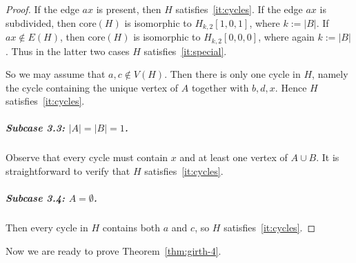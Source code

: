 \documentclass[a4paper,UKenglish,cleveref, autoref, thm-restate]{lipics-v2021}
\newcommand{\core}{\mathrm{core}}
\begin{document}
\begin{proof}
If the edge $ax$ is present, then $H$ satisfies~\ref{it:cycles}.
If the edge $ax$ is subdivided, then $\core(H)$ is isomorphic to $H_{k,2}[1,0,1]$, where $k:=|B|$.
If $ax\notin E(H)$, then $\core(H)$ is isomorphic to $H_{k,2}[0,0,0]$, where again $k:=|B|$.
Thus in the latter two cases $H$ satisfies~\ref{it:special}.

So we may assume that $a,c\notin V(H)$.
Then there is only one cycle in $H$, namely the cycle containing the unique vertex of $A$ together with $b,d,x$.
Hence $H$ satisfies~\ref{it:cycles}.

\subparagraph*{Subcase 3.3: \boldmath $|A|=|B|=1$.}
Observe that every cycle must contain $x$ and at least one vertex of $A\cup B$.
It is straightforward to verify that $H$ satisfies~\ref{it:cycles}.

\subparagraph*{Subcase 3.4: \boldmath $A=\emptyset$.}
Then every cycle in $H$ contains both $a$ and $c$, so $H$ satisfies~\ref{it:cycles}.
\end{proof}

Now we are ready to prove Theorem~\ref{thm:girth-4}.

\GirthFourTheorem*
\end{document}
